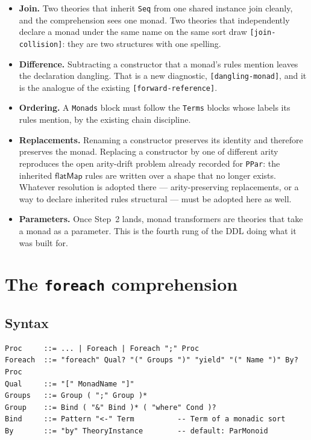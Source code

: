 \documentclass[11pt]{article}
\theoremstyle{definition}
\theoremstyle{plain}
\theoremstyle{remark}
\newcommand{\bind}{\mathsf{flatMap}}
\begin{document}
\begin{itemize}[nosep]
\item \textbf{Join.} Two theories that inherit \texttt{Seq} from one shared
instance join cleanly, and the comprehension sees one monad. Two theories that
independently declare a monad under the same name on the same sort draw
\texttt{[join-collision]}: they are two structures with one spelling.
\item \textbf{Difference.} Subtracting a constructor that a monad's rules
mention leaves the declaration dangling. That is a new diagnostic,
\texttt{[dangling-monad]}, and it is the analogue of the existing
\texttt{[forward-reference]}.
\item \textbf{Ordering.} A \texttt{Monads} block must follow the \texttt{Terms}
blocks whose labels its rules mention, by the existing chain discipline.
\item \textbf{Replacements.} Renaming a constructor preserves its identity and
therefore preserves the monad. Replacing a constructor by one of different arity
reproduces the open arity-drift problem already recorded for \texttt{PPar}:
the inherited \(\bind\) rules are written over a shape that no longer exists.
Whatever resolution is adopted there --- arity-preserving replacements, or a way
to declare inherited rules structural --- must be adopted here as well.
\item \textbf{Parameters.} Once Step~2 lands, monad transformers are theories
that take a monad as a parameter. This is the fourth rung of the DDL doing what
it was built for.
\end{itemize}

\section{The \texttt{foreach} comprehension}
\label{sec:cfl}

\subsection{Syntax}

\begin{lstlisting}[language=bnf]
Proc     ::= ... | Foreach | Foreach ";" Proc
Foreach  ::= "foreach" Qual? "(" Groups ")" "yield" "(" Name ")" By? Proc
Qual     ::= "[" MonadName "]"
Groups   ::= Group ( ";" Group )*
Group    ::= Bind ( "&" Bind )* ( "where" Cond )?
Bind     ::= Pattern "<-" Term          -- Term of a monadic sort
By       ::= "by" TheoryInstance        -- default: ParMonoid
\end{lstlisting}
\end{document}
